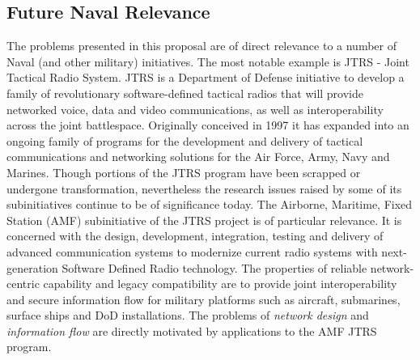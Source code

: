 \subsection{Future Naval Relevance}

The problems presented in this proposal are of direct relevance to a number of Naval (and other military)
initiatives. The most notable example is JTRS \cite{feickert} - Joint Tactical Radio System.
JTRS is a Department of
Defense initiative to develop a family of revolutionary software-defined tactical radios
that will provide networked voice, data and video communications, as well as interoperability
across the joint battlespace. Originally conceived in 1997 it has expanded into an ongoing
family of programs for the development and delivery of tactical communications and networking
solutions for the Air Force, Army, Navy and Marines. Though portions of the JTRS program have
been scrapped or undergone transformation, nevertheless the research issues raised by some of
its subinitiatives continue to be of significance today.
The Airborne, Maritime, Fixed Station (AMF) subinitiative of the JTRS project is of particular
relevance.  It is concerned with the design, development, integration, testing and delivery of
advanced communication systems to modernize current radio systems with next-generation
Software Defined Radio technology. The properties of reliable network-centric capability and legacy
compatibility are to provide joint interoperability and secure information flow for
military platforms such as aircraft, submarines, surface ships and DoD installations.
The problems of {\em network design} and {\em information flow} are directly motivated by
applications to the AMF JTRS program.

